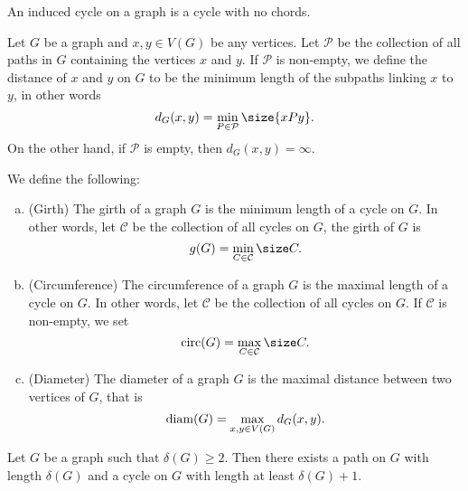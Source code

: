 \begin{definition}\label{def: induced-cycle}
An induced cycle on a graph is a cycle with no chords.
\end{definition}

\begin{definition}[Distance]\label{def: vertex-distance}
Let \(G\) be a graph and \(x, y \in V(G)\) be any vertices. Let \(\mathcal P\)
be the collection of all paths in \(G\) containing the vertices \(x\) and
\(y\). If \(\mathcal P\) is non-empty, we define the distance of \(x\) and
\(y\) on \(G\) to be the minimum length of the subpaths linking \(x\) to
\(y\), in other words
\[
  d_G(x, y) = \min_{P \in \mathcal P} \size{xPy}.
\]
On the other hand, if \(\mathcal P\) is empty, then \(d_G(x, y) = \infty\).
\end{definition}

\begin{definition}
\label{def: miscellaneous-graph-cycle}
We define the following:
\begin{enumerate}[(a).]
  \setlength\itemsep{0.0em}
  \item\label{def: girth}
    (Girth) The girth of a graph \(G\) is the minimum length of a cycle on
    \(G\). In other words, let \(\mathcal C\) be the collection of all cycles
    on \(G\), the girth of \(G\) is
    \[
      g(G) = \min_{C \in \mathcal C} \size C.
    \]
  \item\label{def: circ-graph}
    (Circumference) The circumference of a graph \(G\) is the maximal length
    of a cycle on \(G\). In other words, let \(\mathcal C\) be the collection
    of all cycles on \(G\). If \(\mathcal C\) is non-empty, we set
    \[
      \Circ(G) = \max_{C \in \mathcal C} \size C.
    \]
  \item\label{def: diameter}
    (Diameter) The diameter of a graph \(G\) is the maximal distance between
    two vertices of \(G\), that is
    \[
      \operatorname{diam}(G) = \max_{x, y \in V(G)} d_G(x, y).
    \]
\end{enumerate}
\end{definition}

\begin{proposition}\label{prop: path-cycle-len-delta}
Let \(G\) be a graph such that \(\delta(G) \geq 2\). Then there exists a path
on \(G\) with length \(\delta(G)\) and a cycle on \(G\) with length at least
\(\delta(G) + 1\).
\end{proposition}
